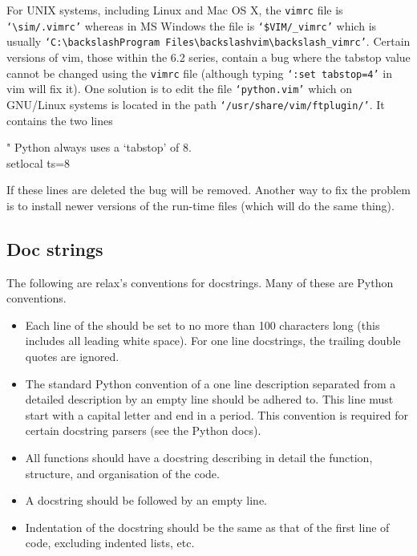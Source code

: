 For UNIX systems, including Linux and Mac OS X, the \texttt{vimrc} file is \texttt{`$\sim$/.vimrc'} whereas in MS Windows the file is \texttt{`\$VIM/\_vimrc'} which is usually \texttt{`C:$\backslash$Program Files$\backslash$vim$\backslash$\_vimrc'}.  Certain versions of vim, those within the 6.2 series, contain a bug where the tabstop value cannot be changed using the \texttt{vimrc} file (although typing \texttt{`:set tabstop=4'} in vim will fix it).  One solution is to edit the file \texttt{`python.vim'} which on GNU/Linux systems is located in the path \texttt{`/usr/share/vim/ftplugin/'}.  It contains the two lines

\begin{exampleenv}
" Python always uses a `tabstop' of 8. \\
setlocal ts=8
\end{exampleenv}

If these lines are deleted the bug will be removed.  Another way to fix the problem is to install newer versions of the run-time files (which will do the same thing).



\subsection{Doc strings}

The following are relax's conventions for docstrings.  Many of these are Python conventions.

\begin{itemize}
\item Each line of the should be set to no more than 100 characters long (this includes all leading white space).  For one line docstrings, the trailing double quotes are ignored.
\item The standard Python convention of a one line description separated from a detailed description by an empty line should be adhered to.  This line must start with a capital letter and end in a period.  This convention is required for certain docstring parsers (see the Python docs).
\item All functions should have a docstring describing in detail the function, structure, and organisation of the code.
\item A docstring should be followed by an empty line.
\item Indentation of the docstring should be the same as that of the first line of code, excluding indented lists, etc.
\end{itemize}

